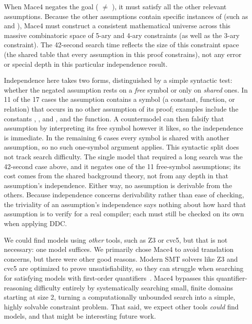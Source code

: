 When Mace4 negates the goal ( $\neq$ ), it must satisfy all the other relevant assumptions. Because the other assumptions contain specific instances of  (such as  and ), Mace4 must construct a consistent mathematical universe across this massive combinatoric space of 5-ary and 4-ary constraints (as well as the 3-ary constraint). The 42-second search time reflects the size of this constraint space (the shared  table that every assumption in this proof constrains), not any error or special depth in this particular independence result.

Independence here takes two forms, distinguished by a simple syntactic test: whether the negated assumption rests on a \emph{free} symbol or only on \emph{shared} ones. In 11 of the 17 cases the assumption contains a symbol (a constant, function, or relation) that occurs in no other assumption of its proof; examples include the constants , , and , and the  function. A countermodel can then falsify that assumption by interpreting its free symbol however it likes, so the independence is immediate. In the remaining 6 cases every symbol is shared with another assumption, so no such one-symbol argument applies. This syntactic split does not track search difficulty. The single model that required a long search was the 42-second  case above, and it negates one of the 11 free-symbol assumptions; its cost comes from the shared background theory, not from any depth in that assumption's independence. Either way, no assumption is derivable from the others. Because independence concerns derivability rather than ease of checking, the triviality of an assumption's independence says nothing about how hard that assumption is to verify for a real compiler; each must still be checked on its own when applying DDC.

We could find models using \emph{other} tools, such as Z3 or cvc5, but that is not necessary: one model suffices. We primarily chose Mace4 to avoid translation concerns, but there were other good reasons. Modern SMT solvers like Z3 and cvc5 are optimized to prove unsatisfiability, so they can struggle when searching for satisfying models with first-order quantifiers~\cite{demoura2011smt,reynolds2013fmf}. Mace4 bypasses this quan\-ti\-fi\-er-reasoning difficulty entirely by systematically searching small, finite domains starting at size 2, turning a computationally unbounded search into a simple, highly solvable constraint problem. That said, we expect other tools \emph{could} find models, and that might be interesting future work.

